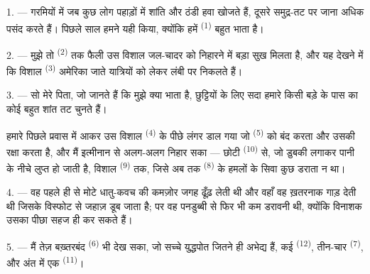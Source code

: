 %

\VUsaut{4.0mm}
\VUsaut{3.0mm}
\VUsaut{3.0mm}

1. --- गरमियों में जब कुछ लोग पहाड़ों में शांति और ठंडी हवा खोजते हैं, दूसरे
समुद्र-तट पर जाना अधिक पसंद करते हैं। पिछले साल हमने यही किया, क्योंकि हमें
 \textsuperscript{(1)} बहुत भाता है।

2. --- मुझे तो  \textsuperscript{(2)} तक फैली उस विशाल जल-चादर को
निहारने में बड़ा सुख मिलता है, और यह देखने में कि विशाल 
\textsuperscript{(3)} अमेरिका जाते यात्रियों को लेकर लंबी 
पर निकलते हैं।

3. --- सो मेरे पिता, जो जानते हैं कि मुझे क्या भाता है, छुट्टियों के लिए सदा
हमारे किसी बड़े  के पास का कोई बहुत शांत तट चुनते हैं।

हमारे पिछले प्रवास में  आकर उस विशाल 
\textsuperscript{(4)} के पीछे लंगर डाल गया जो 
\textsuperscript{(5)} को बंद करता और उसकी रक्षा करता है, और मैं इत्मीनान से
अलग-अलग  निहार सका — छोटी 
\textsuperscript{(10)} से, जो डुबकी लगाकर पानी के नीचे लुप्त हो जाती है, विशाल
 \textsuperscript{(9)} तक, जिसे अब तक 
\textsuperscript{(8)} के हमलों के सिवा कुछ डराता न था।

\VUsaut{3.0mm}
\VUsaut{3.0mm}

4. --- वह पहले ही  से मोटे धातु-कवच की कमज़ोर जगह ढूँढ़ लेती थी
और वहाँ वह ख़तरनाक  गाड़ देती थी जिसके विस्फोट से जहाज़ डूब जाता
है; पर वह पनडुब्बी से फिर भी कम डरावनी थी, क्योंकि विनाशक उसका पीछा सहज ही कर
सकते हैं।

5. --- मैं तेज़ बख़्तरबंद  \textsuperscript{(6)} भी देख सका, जो
सच्चे युद्धपोत जितने ही अभेद्य हैं, कई 
\textsuperscript{(12)}, तीन-चार  \textsuperscript{(7)}, और अंत
में एक  \textsuperscript{(11)}।

